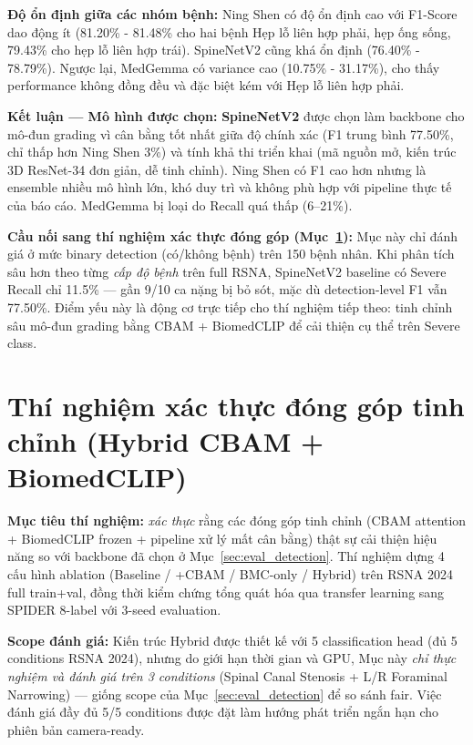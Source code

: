 \textbf{Độ ổn định giữa các nhóm bệnh:} Ning Shen có độ ổn định cao với F1-Score dao động ít (81.20\% - 81.48\% cho hai bệnh Hẹp lỗ liên hợp phải, hẹp ống sống, 79.43\% cho hẹp lỗ liên hợp trái). SpineNetV2 cũng khá ổn định (76.40\% - 78.79\%). Ngược lại, MedGemma có variance cao (10.75\% - 31.17\%), cho thấy performance không đồng đều và đặc biệt kém với Hẹp lỗ liên hợp phải.

\textbf{Kết luận --- Mô hình được chọn:} \textbf{SpineNetV2} được chọn làm backbone cho mô-đun grading vì cân bằng tốt nhất giữa độ chính xác (F1 trung bình 77.50\%, chỉ thấp hơn Ning Shen 3\%) và tính khả thi triển khai (mã nguồn mở, kiến trúc 3D ResNet-34 đơn giản, dễ tinh chỉnh). Ning Shen có F1 cao hơn nhưng là ensemble nhiều mô hình lớn, khó duy trì và không phù hợp với pipeline thực tế của báo cáo. MedGemma bị loại do Recall quá thấp (6--21\%).

\textbf{Cầu nối sang thí nghiệm xác thực đóng góp (Mục~\ref{sec:phase2_eval}):} Mục này chỉ đánh giá ở mức binary detection (có/không bệnh) trên 150 bệnh nhân. Khi phân tích sâu hơn theo từng \emph{cấp độ bệnh} trên full RSNA, SpineNetV2 baseline có Severe Recall chỉ 11.5\% --- gần 9/10 ca nặng bị bỏ sót, mặc dù detection-level F1 vẫn 77.50\%. Điểm yếu này là động cơ trực tiếp cho thí nghiệm tiếp theo: tinh chỉnh sâu mô-đun grading bằng CBAM + BiomedCLIP để cải thiện cụ thể trên Severe class.

\section[Thí nghiệm xác thực đóng góp tinh chỉnh]{Thí nghiệm xác thực đóng góp tinh chỉnh (Hybrid CBAM + BiomedCLIP)}
\label{sec:phase2_eval}

\textbf{Mục tiêu thí nghiệm:} \emph{xác thực} rằng các đóng góp tinh chỉnh (CBAM attention + BiomedCLIP frozen + pipeline xử lý mất cân bằng) thật sự cải thiện hiệu năng so với backbone đã chọn ở Mục~\ref{sec:eval_detection}. Thí nghiệm dựng 4 cấu hình ablation (Baseline / +CBAM / BMC-only / Hybrid) trên RSNA 2024 full train+val, đồng thời kiểm chứng tổng quát hóa qua transfer learning sang SPIDER 8-label với 3-seed evaluation.

\textbf{Scope đánh giá:} Kiến trúc Hybrid được thiết kế với 5 classification head (đủ 5 conditions RSNA 2024), nhưng do giới hạn thời gian và GPU, Mục này \emph{chỉ thực nghiệm và đánh giá trên 3 conditions} (Spinal Canal Stenosis + L/R Foraminal Narrowing) --- giống scope của Mục~\ref{sec:eval_detection} để so sánh fair. Việc đánh giá đầy đủ 5/5 conditions được đặt làm hướng phát triển ngắn hạn cho phiên bản camera-ready.

